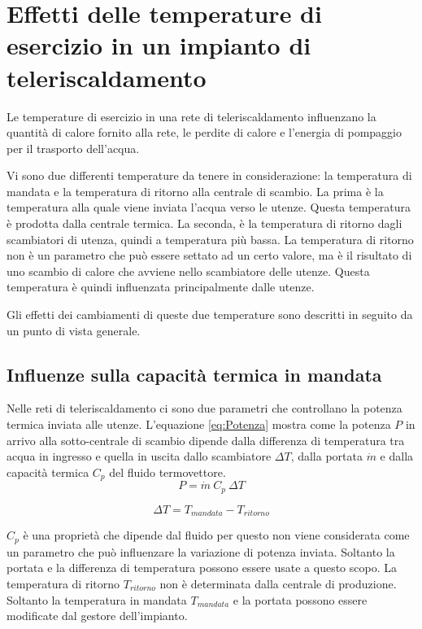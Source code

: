 \documentclass[laurea,oneside,11pt]{USiena_tesiLM}
\begin{document}
\section{Effetti delle temperature di esercizio in un impianto di teleriscaldamento}
Le temperature di esercizio in una rete di teleriscaldamento  influenzano la quantità di calore fornito alla rete, le perdite di calore e l'energia di pompaggio per il trasporto dell'acqua.

Vi sono due differenti temperature da tenere in considerazione: la temperatura di mandata e la temperatura di ritorno alla centrale di scambio. La prima è la temperatura alla quale viene inviata l'acqua verso le utenze. Questa temperatura è prodotta dalla centrale termica. La seconda, è la temperatura di ritorno dagli scambiatori di utenza, quindi a temperatura più bassa. La temperatura di ritorno non è un parametro che può essere settato ad un certo valore, ma è il risultato di uno scambio di calore che avviene nello scambiatore delle utenze. Questa temperatura è quindi influenzata principalmente dalle utenze.

Gli effetti dei cambiamenti di queste due temperature sono descritti in seguito da un punto di vista generale. 

\subsection{Influenze sulla capacità termica in mandata}
Nelle reti di teleriscaldamento ci sono due parametri che controllano la potenza termica inviata alle utenze. L'equazione \ref{eq:Potenza} mostra come la potenza $P$ in arrivo alla sotto-centrale di scambio dipende dalla differenza di temperatura tra acqua in ingresso e quella in uscita dallo scambiatore $\Delta T$, dalla portata $\dot{m}$ e dalla capacità termica $C_p$ del fluido termovettore.
\begin{equation}
P = \dot{m} \ C_p \ \Delta T 
\label{eq:Potenza}
\end{equation} 

\begin{equation}
\Delta T = T_{mandata} - T_{ritorno}
\label{eq:dT}
\end{equation}

$C_p$ è una proprietà che dipende dal fluido per questo non viene considerata come un parametro che può influenzare la variazione di potenza inviata. Soltanto la portata e la differenza di temperatura   possono essere usate a questo scopo. La temperatura di ritorno $T_{ritorno}$ non è determinata dalla centrale di produzione. Soltanto la temperatura in mandata $T_{mandata}$ e la portata possono essere modificate dal gestore dell'impianto.
\end{document}
